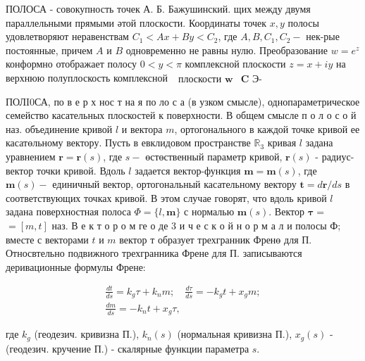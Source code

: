 \documentclass[10pt]{article}
\begin{document}
ПОЛОСА - совокупность точек А. Б. Бажушинский. щих между двумя параллельными прямыми әтой плоскости. Координаты точек $x, y$ полосы удовлетворяют неравенствам $C_{1}<A x+B y<C_{2}$, где $A, B, C_{1}, C_{2}-$ нек-рые постоянные, причем $A$ и $B$ одновременно не равны нулю. Преобразование $w=e^{z}$ конформно отображает полосу $0<y<\pi$ комплексной плоскости $z=x+i y$ на верхнюю полуплоскость комплексной $\begin{array}{ll}\text { плоскости } \boldsymbol{w} & \boldsymbol{C} \text { Э- }\end{array}$



ПОЛI0СА, по в е р х нос т на я по ло с а (в узком смысле), однопараметрическое семейство касательных плоскостей к поверхности. В общем смысле п о л о с о й наз. объединение кривой $l$ и вектора $m$, ортогонального в каждой точке кривой ее касатөльному вектору. Пусть в евклидовом пространстве $\mathbb{R}_{3}$ кривая $l$ задана уравнением $\boldsymbol{r}=\boldsymbol{r}(s)$, где $s-$ өстөственный параметр кривой, $\boldsymbol{r}(s)$ - радиус-вектор точки кривой. Вдоль $l$ задается вектор-функция $\boldsymbol{m}=\boldsymbol{m}(s)$, где $\boldsymbol{m}(s)-$ единичный вектор, ортогональный касательному вектору $\boldsymbol{t}=d \boldsymbol{r} / d s$ в соответствующих точках кривой. В этом случае говорят, что вдоль кривой $l$ задана поверхностная полоса $\Phi=\{l, \boldsymbol{m}\}$ с нормалью $\boldsymbol{m}(s)$. Вектор $\boldsymbol{\tau}=$ $=[m, t]$ наз. В е к т о р о м ге о де 3 и ч е с к о й н о р м а л и полосы Ф; вместе с векторами $t$ и $m$ вектор т образует трехгранник Френө для П. Относвтельно подвижного трехгранника Френе для П. записываются деривационные формулы Френе:



\[

\begin{gathered}

\frac{d t}{d s}=k_{g} \tau+k_{n} m ; \quad \frac{d \tau}{d s}=-k_{g} t+x_{g} m ; \\

\frac{d m}{d s}=-k_{n} t+x_{g} \tau,

\end{gathered}

\]



где $k_{g}$ (геодезич. кривизна П.), $k_{n}(s)$ (нормальная кривизна П.), $x_{g}(s)$ - (геодезич. кручение П.) - скалярные функции параметра $s$.
\end{document}
